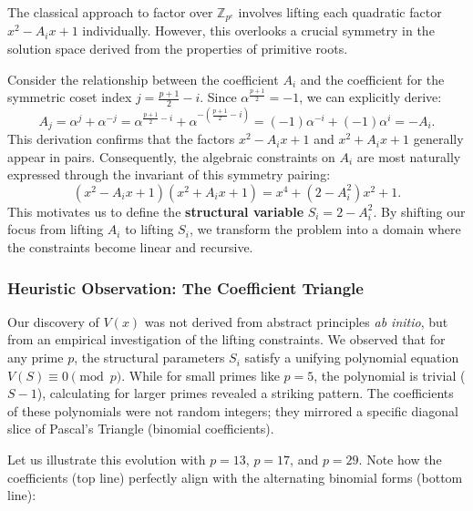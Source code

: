 \documentclass[12pt]{article}
\theoremstyle{plain}
\numberwithin{equation}{section}
\begin{document}
The classical approach to factor over $\mathbb{Z}_{p^e}$ involves lifting each quadratic factor $x^2 - A_i x + 1$ individually. However, this overlooks a crucial symmetry in the solution space derived from the properties of primitive roots.

Consider the relationship between the coefficient $A_i$ and the coefficient for the symmetric coset index $j = \frac{p+1}{2} - i$. Since $\alpha^{\frac{p+1}{2}} = -1$, we can explicitly derive:
\begin{equation}
    A_j = \alpha^j + \alpha^{-j} = \alpha^{\frac{p+1}{2}-i} + \alpha^{-(\frac{p+1}{2}-i)} = (-1)\alpha^{-i} + (-1)\alpha^i = -A_i.
\end{equation}
This derivation confirms that the factors $x^2 - A_i x + 1$ and $x^2 + A_i x + 1$ generally appear in pairs. Consequently, the algebraic constraints on $A_i$ are most naturally expressed through the invariant of this symmetry pairing:
\begin{equation}
    (x^2 - A_i x + 1)(x^2 + A_i x + 1) = x^4 + (2 - A_i^2)x^2 + 1.
\end{equation}
This motivates us to define the \textbf{structural variable} $S_i = 2 - A_i^2$. By shifting our focus from lifting $A_i$ to lifting $S_i$, we transform the problem into a domain where the constraints become linear and recursive.

\subsubsection*{Heuristic Observation: The Coefficient Triangle}

Our discovery of $V(x)$ was not derived from abstract principles \textit{ab initio}, but from an empirical investigation of the lifting constraints.
We observed that for any prime $p$, the structural parameters $S_i$ satisfy a unifying polynomial equation $V(S) \equiv 0 \pmod p$.
While for small primes like $p=5$, the polynomial is trivial ($S-1$), calculating for larger primes revealed a striking pattern. The coefficients of these polynomials were not random integers; they mirrored a specific diagonal slice of Pascal's Triangle (binomial coefficients).

Let us illustrate this evolution with $p=13$, $p=17$, and $p=29$. Note how the coefficients (top line) perfectly align with the alternating binomial forms (bottom line):
\end{document}
